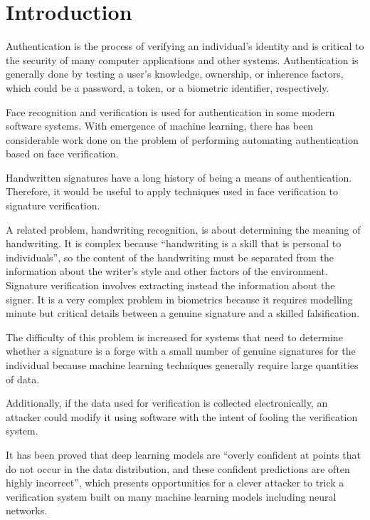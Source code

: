 \section{Introduction}\label{sec:introduction}

Authentication is the process of verifying an individual's identity and is critical to the security of many computer applications and other systems.
Authentication is generally done by testing a user's knowledge, ownership, or inherence factors, which could be a password, a token, or a biometric identifier, respectively\cite{authentication}.

Face recognition and verification is used for authentication in some modern software systems.
With emergence of machine learning, there has been considerable work done on the problem of performing automating authentication based on face verification\cite{sig_net}.

Handwritten signatures have a long history of being a means of authentication\cite{handwriting_survey}.
Therefore, it would be useful to apply techniques used in face verification to signature verification.

A related problem, handwriting recognition, is about determining the meaning of handwriting\cite{handwriting_survey}.
It is complex because ``handwriting is a skill that is personal to individuals'', so the content of the handwriting must be separated from the information about the writer's style and other factors of the environment\cite{handwriting_survey}.
Signature verification involves extracting instead the information about the signer.
It is a very complex problem in biometrics because it requires modelling minute but critical details between a genuine signature and a skilled falsification\cite{sig_net}.

The difficulty of this problem is increased for systems that need to determine whether a signature is a forge with a small number of genuine signatures for the individual because machine learning techniques generally require large quantities of data\cite{handwriting_survey}.

Additionally, if the data used for verification is collected electronically, an attacker could modify it using software with the intent of fooling the verification system.

It has been proved that deep learning models are ``overly confident at points that do not occur in the data distribution, and these confident predictions are often highly incorrect'', which presents opportunities for a clever attacker to trick a verification system built on many machine learning models including neural networks\cite{goodfellow}.
